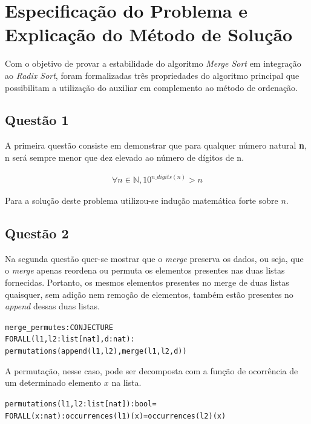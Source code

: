\documentclass[a4paper, 12pt]{article}
\begin{document}
\section{Especificação do Problema e Explicação do Método de Solução}
\label{sec:Especificacao}

Com o objetivo de provar a estabilidade do algoritmo \textit{Merge Sort} em integração ao \textit{Radix Sort}, foram formalizadas três propriedades do algoritmo principal que possibilitam a utilização do auxiliar em complemento ao método de ordenação.

\subsection{Questão 1}
\label{sec:espec-q1}

A primeira questão consiste em demonstrar que para qualquer número natural \textbf{n}, n será sempre menor que dez elevado ao número de dígitos de n.

\begin{equation}
    \begin{split}
        \forall n \in \mathbb{N}, 10^{n\_digits(n)} > n
    \end{split}
    \label{eq:func}
\end{equation}

Para a solução deste problema utilizou-se indução matemática
forte sobre $n$.

\subsection{Questão 2}
\label{sec:espec-q2}

Na segunda questão quer-se mostrar que o \textit{merge} preserva os dados, ou seja, que o \textit{merge} apenas reordena ou permuta os elementos presentes nas duas listas fornecidas. Portanto, os mesmos elementos presentes no merge de duas listas quaisquer, sem adição nem remoção de elementos, também estão presentes no \textit{append} dessas duas listas.
\begin{alltt}
  merge_permutes : CONJECTURE
  FORALL(l1, l2 : list[nat], d : nat):
  permutations(append(l1,l2),merge(l1,l2,d))
\end{alltt}

A permutação, nesse caso, pode ser decomposta com a função de ocorrência de um determinado elemento $x$ na lista.
\begin{alltt}
  permutations(l1,l2:list[nat]):bool =
	FORALL (x:nat): occurrences(l1)(x) = occurrences(l2)(x)
\end{alltt}
\end{document}
